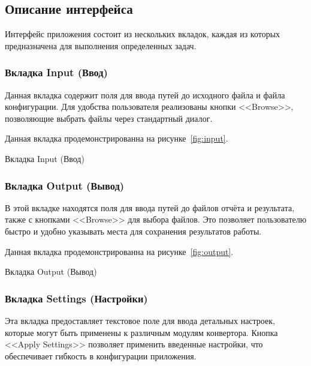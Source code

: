 \subsection{Описание интерфейса}

Интерфейс приложения состоит из нескольких вкладок,
каждая из которых предназначена для выполнения определенных задач.

\subsubsection{Вкладка Input (Ввод)}

Данная вкладка содержит поля для ввода путей до исходного файла
и файла конфигурации.
Для удобства пользователя реализованы кнопки <<Browse>>,
позволяющие выбрать файлы через стандартный диалог.

Данная вкладка продемонстрированна на рисунке~\ref{fig:input}.

\begin{image}
	\caption{Вкладка Input (Ввод)}
	\label{fig:input}
\end{image}

\subsubsection{Вкладка Output (Вывод)}

В этой вкладке находятся поля для ввода путей до файлов отчёта и результата,
также с кнопками <<Browse>> для выбора файлов.
Это позволяет пользователю быстро
и удобно указывать места для сохранения результатов работы.

Данная вкладка продемонстрированна на рисунке~\ref{fig:output}.

\begin{image}
	\caption{Вкладка Output (Вывод)}
	\label{fig:output}
\end{image}

\subsubsection{Вкладка Settings (Настройки)}

Эта вкладка предоставляет текстовое поле
для ввода детальных настроек,
которые могут быть применены к различным модулям конвертора.
Кнопка <<Apply Settings>> позволяет применить введенные настройки,
что обеспечивает гибкость в конфигурации приложения.

